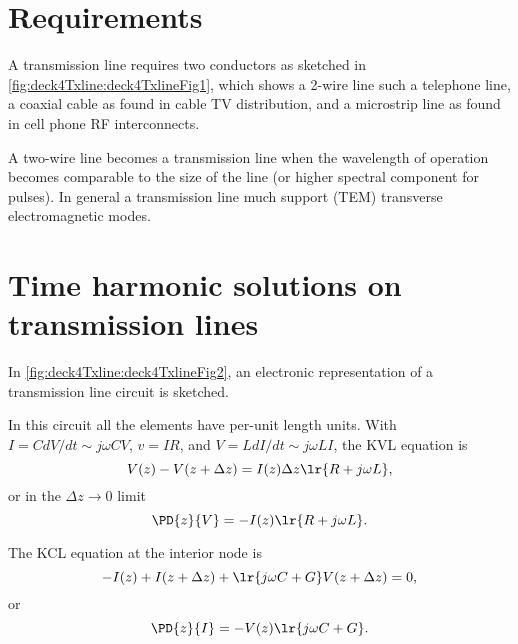 %
%
\section{Requirements}
A transmission line requires two conductors as sketched in \cref{fig:deck4Txline:deck4TxlineFig1}, which shows a 2-wire line such a telephone line, a coaxial cable as found in cable TV distribution, and a microstrip line as found in cell phone RF interconnects.

A two-wire line becomes a transmission line when the wavelength of operation becomes comparable to the size of the line (or higher spectral component for pulses).  In general a transmission line much support (TEM) transverse electromagnetic modes.
\section{Time harmonic solutions on transmission lines}
In \cref{fig:deck4Txline:deck4TxlineFig2}, an electronic representation of a transmission line circuit is sketched.

In this circuit all the elements have per-unit length units.  With \( I = C dV/dt \sim j \omega C V \), \( v = I R \), and \( V = L dI/dt \sim j \omega L I \), the KVL equation is
\begin{dmath}\label{eqn:uwaves4TransmissionLines:20}
V(z) - V(z + \Delta z) = I(z) \Delta z \lr{ R + j \omega L },
\end{dmath}
or in the \( \Delta z \rightarrow 0 \) limit
\begin{dmath}\label{eqn:uwaves4TransmissionLines:40}
\PD{z}{V} = -I(z) \lr{ R + j \omega L }.
\end{dmath}

The KCL equation at the interior node is
\begin{dmath}\label{eqn:uwaves4TransmissionLines:60}
-I(z) + I(z + \Delta z) + \lr{ j \omega C + G} V(z + \Delta z) = 0,
\end{dmath}
or
\begin{dmath}\label{eqn:uwaves4TransmissionLines:80}
\PD{z}{I} = -V(z) \lr{ j \omega C + G}.
\end{dmath}

